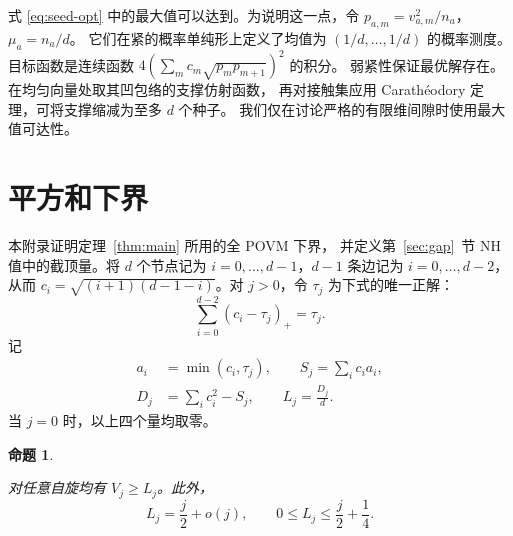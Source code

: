 \documentclass[aps,pra,reprint,superscriptaddress,longbibliography]{revtex4-2}
\newtheorem{proposition}[theorem]{命题}
\theoremstyle{remark}
\begin{document}
式 \eqref{eq:seed-opt} 中的最大值可以达到。为说明这一点，令
$p_{a,m}=v_{a,m}^2/n_a$，$\mu_a=n_a/d$。
它们在紧的概率单纯形上定义了均值为 $(1/d,\ldots,1/d)$ 的概率测度。
目标函数是连续函数 $4(\sum_mc_m\sqrt{p_mp_{m+1}})^2$ 的积分。
弱紧性保证最优解存在。在均匀向量处取其凹包络的支撑仿射函数，
再对接触集应用 Carath\'eodory 定理，可将支撑缩减为至多 $d$ 个种子。
我们仅在讨论严格的有限维间隙时使用最大值可达性。

\section{平方和下界}\label{sec:lower}

本附录证明定理~\ref{thm:main} 所用的全 POVM 下界，
并定义第~\ref{sec:gap}~节 NH 值中的截顶量。将 $d$ 个节点记为 $i=0,\ldots,d-1$，$d-1$ 条边记为 $i=0,\ldots,d-2$，
从而 $c_i=\sqrt{(i+1)(d-1-i)}$。对 $j>0$，令 $\tau_j$ 为下式的唯一正解：
\begin{equation}
 \sum_{i=0}^{d-2}(c_i-\tau_j)_+=\tau_j.
 \label{eq:cap}
\end{equation}
记
\begin{equation}
\begin{aligned}
a_i&=\min(c_i,\tau_j),\qquad S_j=\sum_i c_i a_i,\\
D_j&=\sum_i c_i^2-S_j,\qquad L_j=\frac{D_j}{d}.
\end{aligned}
\label{eq:cap-quantities}
\end{equation}
当 $j=0$ 时，以上四个量均取零。

\begin{proposition}\label{prop:lower}

对任意自旋均有 $V_j\geq L_j$。此外，
\begin{equation}
 L_j=\frac j2+o(j),\qquad 0\leq L_j\leq\frac j2+\frac14.
 \label{eq:lower-asymptotic}
\end{equation}
\end{proposition}
\end{document}
